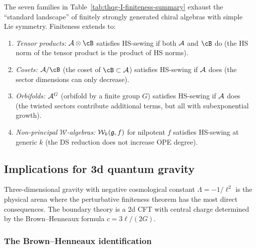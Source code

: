 \begin{remark}[Exhaustiveness]
The seven families in Table~\ref{tab:thqg-I-finiteness-summary} exhaust the ``standard landscape'' of finitely strongly generated chiral algebras with simple Lie symmetry. Finiteness extends to:
\begin{enumerate}[label=\textup{(\alph*)}]
\item \emph{Tensor products:} $\cA \otimes \cB$ satisfies HS-sewing if both $\mathcal{A}$ and $\cB$ do (the HS norm of the tensor product is the product of HS norms).
\item \emph{Cosets:} $\cA / \cB$ (the coset of $\cB \subset \cA$) satisfies HS-sewing if $\mathcal{A}$ does (the sector dimensions can only decrease).
\item \emph{Orbifolds:} $\mathcal{A}^G$ (orbifold by a finite group $G$) satisfies HS-sewing if $\mathcal{A}$ does (the twisted sectors contribute additional terms, but all with subexponential growth).
\item \emph{Non-principal $\mathcal{W}$-algebras:} $\mathcal{W}_k(\mathfrak{g}, f)$ for nilpotent $f$ satisfies HS-sewing at generic $k$ (the DS reduction does not increase OPE degree).
\end{enumerate}
\end{remark}



\subsection{Implications for 3d quantum gravity}
\label{subsec:thqg-I-3d-gravity}

Three-dimensional gravity with negative cosmological constant $\Lambda = -1/\ell^2$ is the physical arena where the perturbative finiteness theorem has the most direct consequences. The boundary theory is a 2d CFT with central charge determined by the Brown--Henneaux formula $c = 3\ell/(2G)$.

\subsubsection{The Brown--Henneaux identification}

